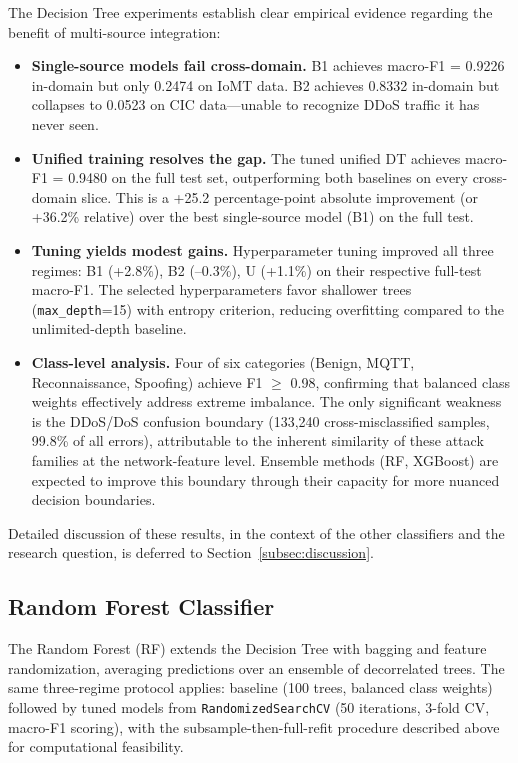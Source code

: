 The Decision Tree experiments establish clear empirical evidence regarding the benefit of multi-source integration:

\begin{itemize}[nosep]
  \item \textbf{Single-source models fail cross-domain.} B1 achieves macro-F1 = 0.9226 in-domain but only 0.2474 on IoMT data. B2 achieves 0.8332 in-domain but collapses to 0.0523 on CIC data---unable to recognize DDoS traffic it has never seen.
  \item \textbf{Unified training resolves the gap.} The tuned unified DT achieves macro-F1 = 0.9480 on the full test set, outperforming both baselines on every cross-domain slice. This is a +25.2 percentage-point absolute improvement (or +36.2\% relative) over the best single-source model (B1) on the full test.
  \item \textbf{Tuning yields modest gains.} Hyperparameter tuning improved all three regimes: B1 (+2.8\%), B2 (--0.3\%), U (+1.1\%) on their respective full-test macro-F1. The selected hyperparameters favor shallower trees (\texttt{max\_depth}=15) with entropy criterion, reducing overfitting compared to the unlimited-depth baseline.
  \item \textbf{Class-level analysis.} Four of six categories (Benign, MQTT, Reconnaissance, Spoofing) achieve F1 $\geq$ 0.98, confirming that balanced class weights effectively address extreme imbalance. The only significant weakness is the DDoS/DoS confusion boundary (133,240 cross-misclassified samples, 99.8\% of all errors), attributable to the inherent similarity of these attack families at the network-feature level. Ensemble methods (RF, XGBoost) are expected to improve this boundary through their capacity for more nuanced decision boundaries.
\end{itemize}

Detailed discussion of these results, in the context of the other classifiers and the research question, is deferred to Section~\ref{subsec:discussion}.

\subsection{Random Forest Classifier}
\label{subsec:random-forest}

The Random Forest (RF) extends the Decision Tree with bagging and feature randomization, averaging predictions over an ensemble of decorrelated trees. The same three-regime protocol applies: baseline (100 trees, balanced class weights) followed by tuned models from \texttt{RandomizedSearchCV} (50 iterations, 3-fold CV, macro-F1 scoring), with the subsample-then-full-refit procedure described above for computational feasibility.

